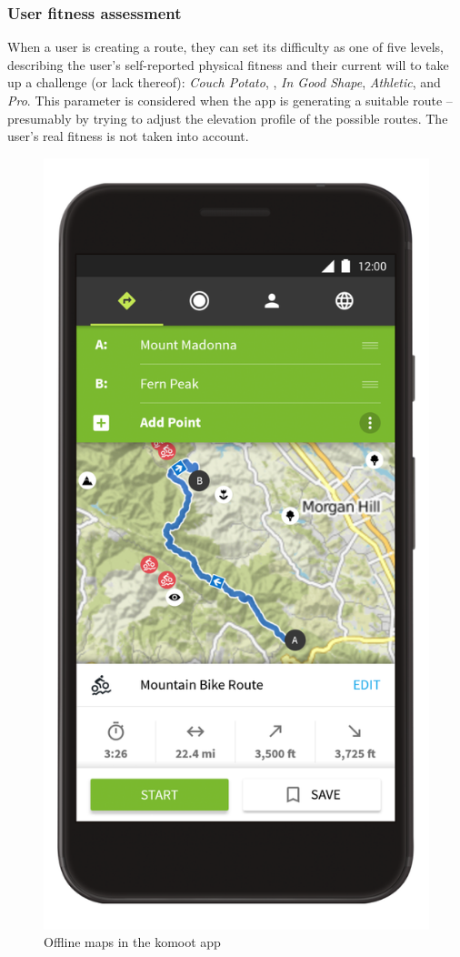\subsubsection*{User fitness assessment}
When a user is creating a route, they can set its difficulty as one of five levels, 
describing the user's self-reported physical fitness and their current will to take up a challenge (or lack thereof): \textit{Couch Potato}, , \textit{In Good Shape}, \textit{Athletic}, and \textit{Pro}.
This parameter is considered when the app is generating a suitable route -- presumably by trying to adjust the elevation profile of the possible routes.
The user's real fitness is not taken into account.

\begin{figure}[h]
    \includegraphics[width=\textwidth]{Images/komoot-nav.png}
    \caption{Offline maps in the komoot app\cite{komoot-nav-img}}
\end{figure}

